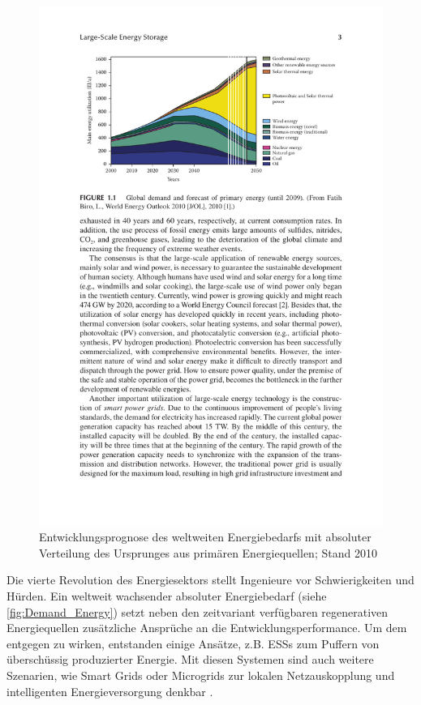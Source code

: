 \begin{figure}[H]
    \centering
    \includegraphics[width=\textwidth]{images/01kapitel/demand_primary_energy.pdf}
    \caption[Prognose des globalen Energiebedarfs]{Entwicklungsprognose des weltweiten Energiebedarfs mit absoluter Verteilung des Ursprunges aus primären Energiequellen; Stand 2010 \cite{Zhan.2018}}
    \label{fig:Demand_Energy}
\end{figure}

Die vierte Revolution des Energiesektors stellt Ingenieure vor Schwierigkeiten und Hürden. Ein weltweit wachsender absoluter Energiebedarf (siehe \autoref{fig:Demand_Energy}) setzt neben den zeitvariant verfügbaren regenerativen Energiequellen zusätzliche Ansprüche an die Entwicklungsperformance. Um dem entgegen zu wirken, entstanden einige Ansätze, z.B. \acp{ESS} zum Puffern von überschüssig produzierter Energie. Mit diesen Systemen sind auch weitere Szenarien, wie Smart Grids oder Microgrids zur lokalen Netzauskopplung und intelligenten Energieversorgung denkbar \cite{Zhan.2016, Esca.2018, Wess.2013, Turk.2013, Dhun.2020, Leop.2014, Ton.2012}.


